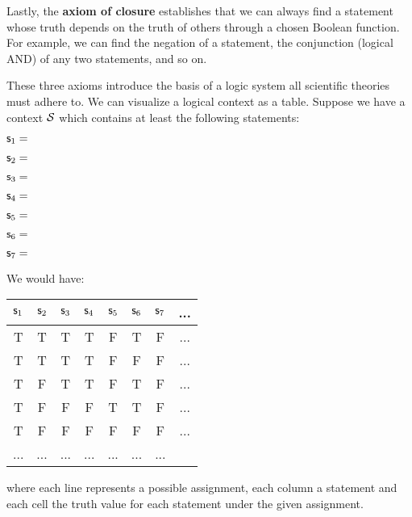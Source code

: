 \documentclass[twocolumn]{article}
\begin{document}
Lastly, the \textbf{axiom of closure} establishes that we can always find a statement whose truth depends on the truth of others through a chosen Boolean function. For example, we can find the negation of a statement, the conjunction (logical AND) of any two statements, and so on.

These three axioms introduce the basis of a logic system all scientific theories must adhere to. We can visualize a logical context as a table. Suppose we have a context $\mathcal{S}$ which contains at least the following statements:
\begin{description}
	\item $\mathsf{s}_1=$
	\item $\mathsf{s}_2=$
	\item $\mathsf{s}_3=$
	\item $\mathsf{s}_4=$
	\item $\mathsf{s}_5=$
	\item $\mathsf{s}_6=$
	\item $\mathsf{s}_7=$
\end{description}
We would have:
\begin{center}
	\begin{tabular}{c|c|c|c|c|c|c|c}
		$\mathsf{s}_1$ & $\mathsf{s}_2$ & $\mathsf{s}_3$ & $\mathsf{s}_4$ & $\mathsf{s}_5$ & $\mathsf{s}_6$ & $\mathsf{s}_7$ & ... \\
		\hline
		T & T & T & T & F & T & F & ... \\
		T & T & T & T & F & F & F & ... \\
		T & F & T & T & F & T & F & ... \\
		T & F & F & F & T & T & F & ... \\
		T & F & F & F & F & F & F & ... \\
		... & ... & ... & ... & ... & ... & ... \\
	\end{tabular}
\end{center}
where each line represents a possible assignment, each column a statement and each cell the truth value for each statement under the given assignment.
\end{document}
